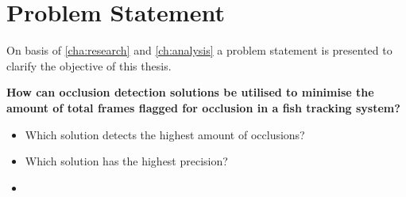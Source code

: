 \chapter{Problem Statement}
On basis of \autoref{cha:research}  and \autoref{ch:analysis}  a problem statement is presented to clarify the objective of this thesis.

\textbf{How can occlusion detection solutions be utilised to minimise the amount of total frames flagged for occlusion in a fish tracking system?}

\begin{itemize}
	\item Which solution detects the highest amount of occlusions?
	\item Which solution has the highest precision?
	\item 
\end{itemize}